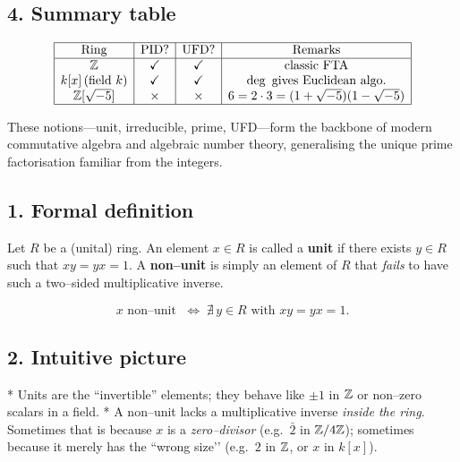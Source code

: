 \documentclass[12pt]{article}
\theoremstyle{definition} %
\theoremstyle{plain} %
\begin{document}
\medskip

\subsection*{4.  Summary table}

\[
\begin{array}{|c|c|c|c|}\hline
  \text{Ring} & \text{PID?} & \text{UFD?} & \text{Remarks}\\ \hline
  \mathbb Z                      & \checkmark & \checkmark & \text{classic FTA}\\
  k[x]\,(\text{field }k)         & \checkmark & \checkmark & \deg \text{ gives Euclidean algo.}\\
  \mathbb Z[\sqrt{-5}]          & \times     & \times     & 6=2\cdot3=(1+\sqrt{-5})(1-\sqrt{-5})\\ \hline
\end{array}
\]

\bigskip
\noindent
These notions—unit, irreducible, prime, UFD—form the backbone of
modern commutative algebra and algebraic number theory, generalising
the unique prime factorisation familiar from the integers.

\subsection*{1.  Formal definition}

Let $R$ be a (unital) ring.  
An element $x\in R$ is called a \textbf{unit} if there exists
$y\in R$ such that $xy=yx=1$.  
A \textbf{non–unit} is simply an element of $R$ that \emph{fails} to have such
a two–sided multiplicative inverse.

\vspace{4pt}
\[
  x\text{ non–unit }\;\Longleftrightarrow\;
  \nexists\,y\in R\text{ with }xy=yx=1 .
\]

\subsection*{2.  Intuitive picture}

* Units are the “invertible” elements; they behave like $\pm1$ in
  $\Bbb Z$ or non–zero scalars in a field.
* A non–unit lacks a multiplicative inverse \emph{inside the ring}.
  Sometimes that is because $x$ is a \emph{zero–divisor}
  (e.g.\ $\bar 2$ in $\Bbb Z/4\Bbb Z$);  
  sometimes because it merely has the “wrong size’’ (e.g.\ $2$ in $\Bbb Z$,
  or $x$ in $k[x]$).
\end{document}
